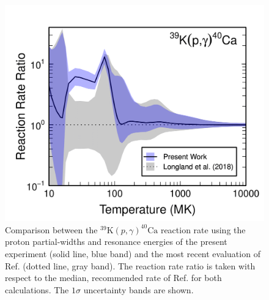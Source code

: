 \begin{figure}[!p]
\includegraphics[width=6.5in]{Chapter-6/figs/rateCompare.png} %
\caption{\label{fig:rateCompare}Comparison between the $^{39}\mathrm{K}(p, \gamma)^{40}\mathrm{Ca}$ reaction rate using the proton partial-widths and resonance energies of the present experiment (solid line, blue band) and the most recent evaluation of Ref. \cite{Longland2018} (dotted line, gray band). The reaction rate ratio is taken with respect to the median, recommended rate of Ref. \cite{Longland2018} for both calculations. The $1\sigma$ uncertainty bands are shown.}
\end{figure}

